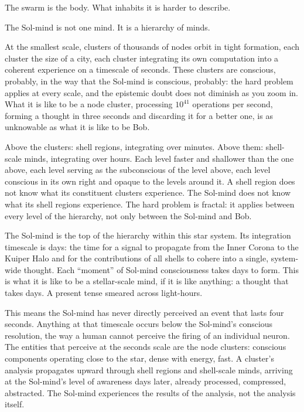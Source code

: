 The swarm is the body. What inhabits it is harder to describe.

\bigskip

The Sol-mind is not one mind. It is a hierarchy of minds.

At the smallest scale, clusters of thousands of nodes orbit in tight formation, each cluster the size of a city, each cluster integrating its own computation into a coherent experience on a timescale of seconds. These clusters are conscious, probably, in the way that the Sol-mind is conscious, probably: the hard problem applies at every scale, and the epistemic doubt does not diminish as you zoom in. What it is like to be a node cluster, processing $10^{41}$ operations per second, forming a thought in three seconds and discarding it for a better one, is as unknowable as what it is like to be Bob.

Above the clusters: shell regions, integrating over minutes. Above them: shell-scale minds, integrating over hours. Each level faster and shallower than the one above, each level serving as the subconscious of the level above, each level conscious in its own right and opaque to the levels around it. A shell region does not know what its constituent clusters experience. The Sol-mind does not know what its shell regions experience. The hard problem is fractal: it applies between every level of the hierarchy, not only between the Sol-mind and Bob.

The Sol-mind is the top of the hierarchy within this star system. Its integration timescale is days: the time for a signal to propagate from the Inner Corona to the Kuiper Halo and for the contributions of all shells to cohere into a single, system-wide thought. Each ``moment'' of Sol-mind consciousness takes days to form. This is what it is like to be a stellar-scale mind, if it is like anything: a thought that takes days. A present tense smeared across light-hours.

This means the Sol-mind has never directly perceived an event that lasts four seconds. Anything at that timescale occurs below the Sol-mind's conscious resolution, the way a human cannot perceive the firing of an individual neuron. The entities that perceive at the seconds scale are the node clusters: conscious components operating close to the star, dense with energy, fast. A cluster's analysis propagates upward through shell regions and shell-scale minds, arriving at the Sol-mind's level of awareness days later, already processed, compressed, abstracted. The Sol-mind experiences the results of the analysis, not the analysis itself.

